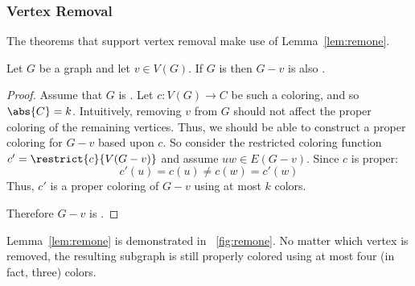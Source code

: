 \subsubsection{Vertex Removal}\label{sec:sub:sub:vremove}

The theorems that support vertex removal make use of Lemma~\ref{lem:remone}.

\begin{lemma}
  \label{lem:remone}
  Let \(G\) be a graph and let \(v\in V(G)\).  If \(G\) is  then \(G-v\) is also .
\end{lemma}

\begin{proof}
  Assume that \(G\) is .  Let \(c:V(G)\to C\) be such a coloring, and so \(\abs{C}=k\).  Intuitively,
  removing \(v\) from \(G\) should not affect the proper coloring of the remaining vertices.  Thus, we should be
  able to construct a proper coloring for \(G-v\) based upon \(c\).  So consider the restricted coloring function
  \(c'=\restrict{c}{V(G-v)}\) and assume \(uw\in E(G-v)\).  Since \(c\) is proper:
  \[c'(u)=c(u)\ne c(w)=c'(w)\]
  Thus, \(c'\) is a proper coloring of \(G-v\) using at most \(k\) colors.

  Therefore \(G-v\) is .
\end{proof}

Lemma~\ref{lem:remone} is demonstrated in \figurename~\ref{fig:remone}.  No matter which vertex is removed, the
resulting subgraph is still properly colored using at most four (in fact, three) colors.

